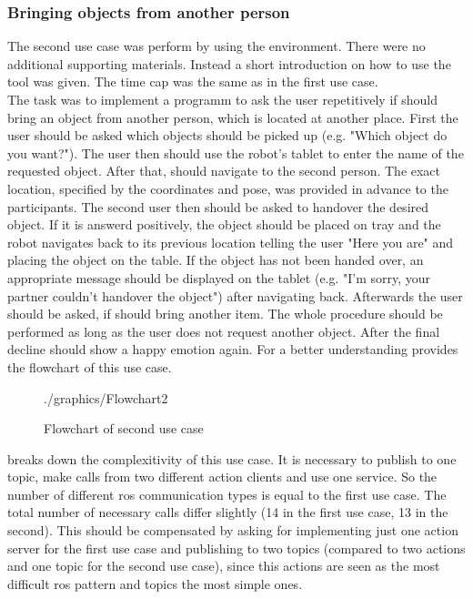 \subsubsection*{Bringing objects from another person}
The second use case was perform by using the \toolname{} environment. There were no additional supporting materials. Instead a short introduction on how to use the tool was given. The time cap was the same as in the first use case. \\

The task was to implement a programm to ask the user repetitively if \hobbit{} should bring an object from another person, which is located at another place. First the user should be asked which objects should be picked up (e.g. "Which object do you want?"). The user then should use the robot's tablet to enter the name of the requested object. After that, \hobbit{} should navigate to the second person. The exact location, specified by the coordinates and pose, was provided in advance to the participants. The second user then should be asked to handover the desired object. If it is answerd positively, the object should be placed on \hobbit{} tray and the robot navigates back to its previous location telling the user "Here you are" and placing the object on the table. If the object has not been handed over, an appropriate message should be displayed on the tablet (e.g. "I'm sorry, your partner couldn't handover the object") after navigating back. Afterwards the user should be asked, if \hobbit{} should bring another item. The whole procedure should be performed as long as the user does not request another object. After the final decline \hobbit{} should show a happy emotion again. For a better understanding  provides the flowchart of this use case. \\

\begin{figure}[!htbp]
	\centering
	\begin{overpic}[width=0.9\linewidth]{./graphics/Flowchart2}
	\end{overpic}
    \caption{Flowchart of second use case}%
	\label{fig:SecondUserCaseFlow}%
\end{figure}

 breaks down the complexitivity of this use case. It is necessary to publish to one topic, make calls from two different action clients and use one service. So the number of different \gls{ros} communication types is equal to the first use case. The total number of necessary calls differ slightly (14 in the first use case, 13 in the second). This should be compensated by asking for implementing just one action server for the first use case and publishing to two topics (compared to two actions and one topic for the second use case), since this actions are seen as the most difficult \gls{ros} pattern and topics the most simple ones.

